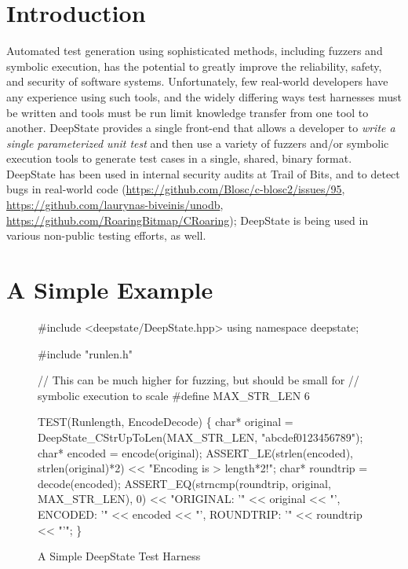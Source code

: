 \documentclass[sigconf]{acmart}
\begin{document}



\maketitle

\section{Introduction}

Automated test generation using sophisticated methods, including fuzzers and symbolic execution, has the potential to greatly improve the reliability, safety, and security of software systems.  Unfortunately, few real-world developers have any experience using such tools, and the widely differing ways test harnesses must be written \cite{WODACommon} and tools must be run limit knowledge transfer from one tool to another.  DeepState \cite{goodman2018deepstate} provides a single front-end that allows a developer to \emph{write a single parameterized unit test} \cite{ParamUnit}  and then use a variety of fuzzers and/or symbolic execution tools to generate test cases in a single, shared, binary format.  DeepState has been used in internal security audits at Trail of Bits, and to detect bugs in real-world code (\url{https://github.com/Blosc/c-blosc2/issues/95}, \url{https://github.com/laurynas-biveinis/unodb}, \url{https://github.com/RoaringBitmap/CRoaring}); DeepState is being used in various non-public testing efforts, as well.

\section{A Simple Example}

\begin{figure}
{\scriptsize
\begin{code}
\#include <deepstate/DeepState.hpp>
using namespace deepstate;

\#include  "runlen.h"

// This can be much higher for fuzzing, but should be small for
// symbolic execution to scale
\#define MAX\_STR\_LEN 6

TEST(Runlength, EncodeDecode) \{
  char* original = DeepState\_CStrUpToLen(MAX\_STR\_LEN,
                                         "abcdef0123456789");
  char* encoded = encode(original);
  ASSERT\_LE(strlen(encoded), strlen(original)*2) <<
   "Encoding is > length*2!";
  char* roundtrip = decode(encoded);
  ASSERT\_EQ(strncmp(roundtrip, original, MAX\_STR\_LEN), 0) <<
    "ORIGINAL: '" << original << "', ENCODED: '" << encoded <<
    "', ROUNDTRIP: '" << roundtrip << "'";
\}
\end{code}
}
  \caption{A Simple DeepState Test Harness}
  \label{fig:example}
  \end{figure}
\end{document}
